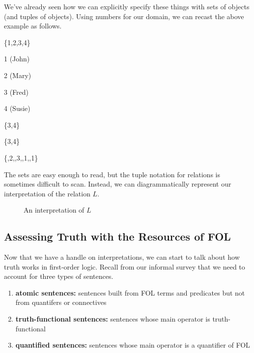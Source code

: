 We've already seen how we can explicitly specify these things with sets of
objects (and tuples of objects). Using numbers for our domain, we can recast
the above example as follows.

\begin{grayarg}
  \item[\textbf{D:}] \{1,2,3,4\}
  \item[$j$:] 1 (John)
  \item[$m$:] 2 (Mary)
  \item[$f$:] 3 (Fred)
  \item[$s$:] 4 (Susie)
  \item[$P$:] \{3,4\}
  \item[$E$:] \{3,4\}
  \item[$L$:] \{,2\textrangle,,3\textrangle,,1\textrangle,,1\textrangle\}
\end{grayarg}

The sets are easy enough to read, but the tuple notation for relations is
sometimes difficult to scan. Instead, we can diagrammatically represent our
interpretation of the relation $L$.

\begin{figure}[h]
  \centering
  \caption{An interpretation of $L$}
  \label{fig:model-of-love}
\end{figure}

\subsection{Assessing Truth with the Resources of FOL}

Now that we have a handle on interpretations, we can start to talk about how
truth works in first-order logic. Recall from our informal survey that we need
to account for three types of sentences.

\begin{enumerate}
\item \textbf{atomic sentences:} sentences built from FOL terms and predicates
  but not from quantifers or connectives
\item \textbf{truth-functional sentences:} sentences whose main operator is
  truth-functional
\item \textbf{quantified sentences:} sentences whose main operator is
  a quantifier of FOL
\end{enumerate}

